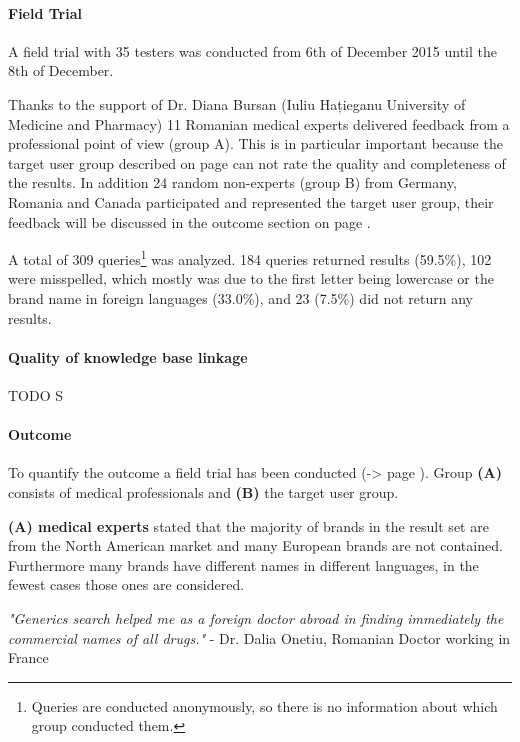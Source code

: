 \documentclass[11pt,titlepage,oneside,openany]{book}
\begin{document}
\paragraph{Field Trial}
\label{cha:field_trial}
A field trial with 35 testers was conducted from 6th of December 2015 until the 8th of December.

Thanks to the support of Dr. Diana Bursan (Iuliu Hațieganu University of Medicine and Pharmacy) 11 Romanian medical experts delivered feedback from a professional point of view (group A). This is in particular important because the target user group described on page \pageref{cha:domain} can not rate the quality and completeness of the results.
In addition 24 random non-experts (group B) from Germany, Romania and Canada participated and represented the target user group, their feedback will be discussed in the outcome section on page \pageref{sec:outcome}. 

A total of 309 queries\footnote{Queries are conducted anonymously, so there is no information about which group conducted them.} was analyzed. 184 queries returned results (59.5\%), 102 were misspelled, which mostly was due to the first letter being lowercase or the brand name in foreign languages (33.0\%), and 23 (7.5\%) did not return any results.  

\paragraph{Quality of knowledge base linkage}
\label{cha:example}

TODO S

\paragraph{Outcome}
\label{sec:outcome}
To quantify the outcome a field trial has been conducted (-> page \pageref{cha:field_trial}). Group \textbf{(A)} consists of medical professionals and \textbf{(B)} the target user group.

\textbf{(A) medical experts} stated that the majority of brands in the result set are from the North American market and many European brands are not contained. Furthermore many brands have different names in different languages, in the fewest cases those ones are considered.

\textit{"Generics search helped me as a foreign doctor abroad in finding immediately the commercial names of all drugs."} - Dr. Dalia Onetiu, Romanian Doctor working in France
\end{document}
